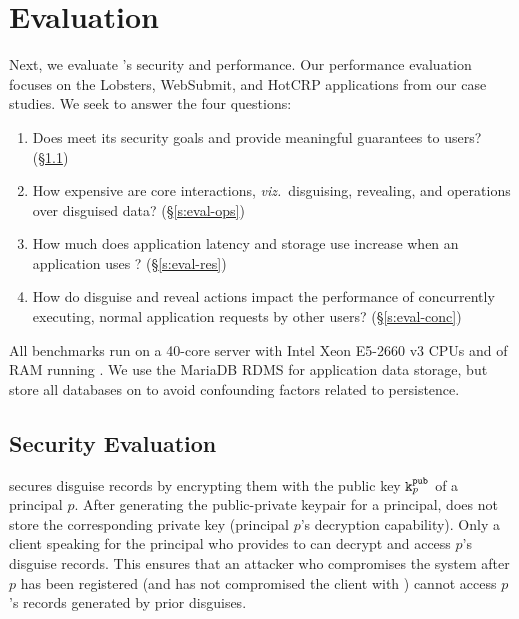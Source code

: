 \section{Evaluation}
\label{s:eval}

%
Next, we evaluate \sys's security and performance.
%
Our performance evaluation focuses on the Lobsters, WebSubmit, and HotCRP applications
from our case studies.
%
We seek to answer the four questions:
%
\begin{enumerate}[nosep]
 \item Does \sys meet its security goals and provide meaningful guarantees to users?
   (\S\ref{s:eval-security})
 \item How expensive are core \sys interactions, \emph{viz.}\ disguising, revealing, and
   operations over disguised data? (\S\ref{s:eval-ops})
 \item How much does application latency and storage use increase when an application
   uses \sys? (\S\ref{s:eval-res})
 \item How do disguise and reveal actions impact the performance of concurrently executing,
   normal application requests by other users? (\S\ref{s:eval-conc})
\end{enumerate}
%
All benchmarks run on a 40-core server with Intel Xeon E5-2660 v3 CPUs and  of RAM
running .
%
We use the MariaDB RDMS for application data storage, but store all databases on 
to avoid confounding factors related to persistence.
%

\subsection{Security Evaluation}
\label{s:eval-security}

\sys secures disguise records by encrypting them with the public key $\texttt{\ensuremath{\texttt{k}^{\text{pub}}_{p}}}$ of a principal $p$.
After generating the public-private keypair for a principal, \sys does not store the corresponding
private key  (principal $p$'s decryption capability). Only a client speaking for the
principal who provides  to \sys can decrypt and access $p$'s disguise records.
This ensures that an attacker who compromises the system after $p$ has been registered (and has not
compromised the client with ) cannot access $p$'s records generated by prior disguises.

